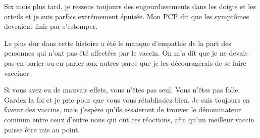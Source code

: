 Six mois plus tard, je ressens toujours des engourdissements dans les doigts et
les orteils et je suis parfois extrêmement épuisée. Mon PCP dit que les
symptômes devraient finir par s'estomper.

Le plus dur dans cette histoire a été le manque d'empathie de la part des
personnes qui n'ont pas été affectées par le vaccin. On m'a dit que je ne devais
pas en parler ou en parler aux autres parce que je les découragerais de se faire
vacciner.

Si vous avez eu de mauvais effets, vous n'êtes pas seul. Vous n'êtes pas
folle. Gardez la foi et je prie pour que vous vous rétablissiez bien. Je suis
toujours en faveur des vaccins, mais j'espère qu'ils essaieront de trouver le
dénominateur commun entre ceux d'entre nous qui ont ces réactions, afin qu'un
meilleur vaccin puisse être mis au point.
